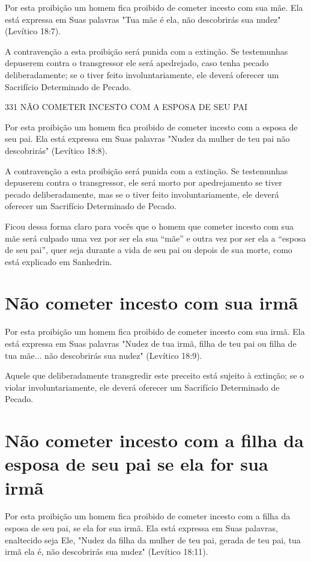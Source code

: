 Por esta proibição um homem fica proibido de cometer incesto com sua
mãe. Ela está expressa em Suas palavras "Tua mãe é ela, não descobrirás
sua nudez" (Levítico 18:7).

A contravenção a esta proibição será punida com a extinção. Se
tes­temunhas depuserem contra o transgressor ele será apedrejado, caso
tenha pe­cado deliberadamente; se o tiver feito involuntariamente, ele
deverá oferecer um Sacrifício Determinado de Pecado.

331 NÃO COMETER INCESTO COM A ESPOSA DE SEU PAI

Por esta proibição um homem fica proibido de cometer incesto com a
esposa de seu pai. Ela está expressa em Suas palavras "Nudez da mulher
de teu pai não descobrirás" (Levítico 18:8).

A contravenção a esta proibição será punida com a extinção. Se
tes­temunhas depuserem contra o transgressor, ele será morto por
apedrejamento se tiver pecado deliberadamente, mas se o tiver feito
involuntariamente, ele de­verá oferecer um Sacrifício Determinado de
Pecado.

Ficou dessa forma claro para vocês que o homem que cometer in­cesto com
sua mãe será culpado uma vez por ser ela sua ``mãe'' e outra vez por ser
ela a ``esposa de seu pai'', quer seja durante a vida de seu pai ou depois
de sua morte, como está explicado em Sanhedrin.

\section{Não cometer incesto com sua irmã}

Por esta proibição um homem fica proibido de cometer incesto com sua
irmã. Ela está expressa em Suas palavras "Nudez de tua irmã, filha de
teu pai ou filha de tua mãe... não descobrirás sua nudez" (Levítico
18:9).

Aquele que deliberadamente transgredir este preceito está sujeito à
extinção; se o violar involuntariamente, ele deverá oferecer um
Sacrifício De­terminado de Pecado.

\section{Não cometer incesto com a filha da esposa de seu pai se ela for sua irmã}

Por esta proibição um homem fica proibido de cometer incesto com a filha
da esposa de seu pai, se ela for sua irmã. Ela está expressa em Suas
pala­vras, enaltecido seja Ele, "Nudez da filha da mulher de teu pai,
gerada de teu pai, tua irmã ela é, não descobrirás sua nudez" (Levítico
18:11).

